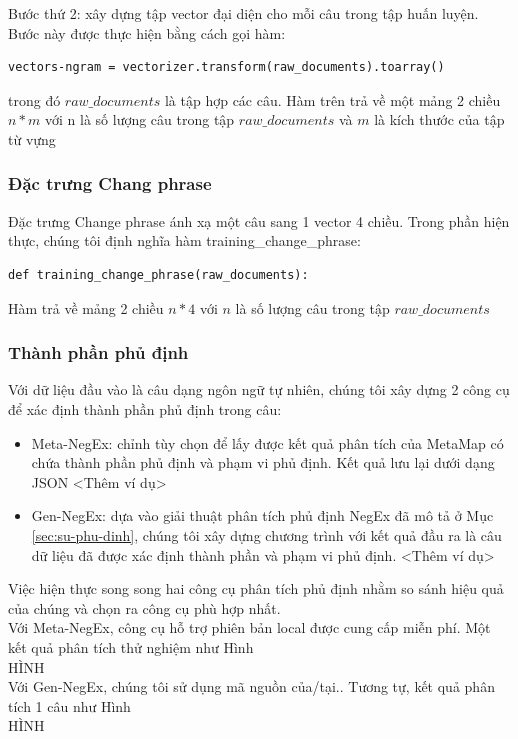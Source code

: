 Bước thứ 2: xây dựng tập vector đại diện cho mỗi câu trong tập huấn luyện. Bước này được thực hiện bằng cách gọi hàm:
\begin{lstlisting}
vectors-ngram = vectorizer.transform(raw_documents).toarray()
\end{lstlisting}
trong đó $raw\_documents$ là tập hợp các câu. Hàm trên trả về một mảng 2 chiều $n*m$ với n là số lượng câu trong tập $raw\_documents$ và $m$ là kích thước của tập từ vựng
\subsubsection*{Đặc trưng Chang phrase}
Đặc trưng Change phrase ánh xạ một câu sang 1 vector 4 chiều. Trong phần hiện thực, chúng tôi định nghĩa hàm training\_change\_phrase:
\begin{lstlisting}
def training_change_phrase(raw_documents):
\end{lstlisting}
Hàm trả về mảng 2 chiều $n*4$ với $n$ là số lượng câu trong tập $raw\_documents$

\subsubsection*{Thành phần phủ định}
Với dữ liệu đầu vào là câu dạng ngôn ngữ tự nhiên, chúng tôi xây dựng 2 công cụ để xác định thành phần phủ định trong câu:
\begin{itemize}
\item Meta-NegEx: chỉnh tùy chọn  để lấy được kết quả phân tích của MetaMap có chứa thành phần phủ định và phạm vi phủ định. Kết quả lưu lại dưới dạng JSON <Thêm ví dụ>
\item Gen-NegEx: dựa vào giải thuật phân tích phủ định NegEx đã mô tả ở Mục \ref{sec:su-phu-dinh}, chúng tôi xây dựng chương trình với kết quả đầu ra là câu dữ liệu đã được xác định thành phần và phạm vi phủ định. <Thêm ví dụ>
\end{itemize}

Việc hiện thực song song hai công cụ phân tích phủ định nhằm so sánh hiệu quả của chúng và chọn ra công cụ phù hợp nhất.\\

Với Meta-NegEx, công cụ hỗ trợ phiên bản local được cung cấp miễn phí. Một kết quả phân tích thử nghiệm như Hình\\
HÌNH\\

Với Gen-NegEx, chúng tôi sử dụng mã nguồn của/tại.. Tương tự, kết quả phân tích 1 câu như Hình \\
HÌNH

